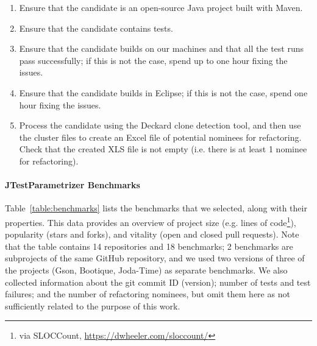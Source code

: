 \begin{enumerate}
  \item Ensure that the candidate is an open-source Java project built with Maven.
  \item Ensure that the candidate contains tests.
  \item Ensure that the candidate builds on our machines and that all the test runs pass successfully; if this is not the case, spend up to one hour fixing the issues.
  \item Ensure that the candidate builds in Eclipse; if this is not the case, spend one hour fixing the issues.
  \item Process the candidate using the Deckard clone detection tool, and then use the cluster files to create an Excel file of potential nominees for refactoring. Check that the created XLS file is not empty (i.e. there is at least 1 nominee for refactoring).
\end{enumerate}

\paragraph{JTestParametrizer Benchmarks}
Table~\ref{table:benchmarks} lists the benchmarks that we selected,
along with their properties. This data provides an overview of project
size (e.g. lines of code\footnote{via SLOCCount, \url{https://dwheeler.com/sloccount/}}), popularity (stars and forks), and vitality (open and
closed pull requests). Note that the table contains 14 repositories and 18 benchmarks; 2 benchmarks are subprojects of the same GitHub repository, and we used two versions of three of the projects (Gson, Bootique, Joda-Time) as separate benchmarks.
We also collected information about the git commit ID (version); number of tests and test failures; and the number of refactoring nominees, but omit them here as not sufficiently related to the purpose of this work.

